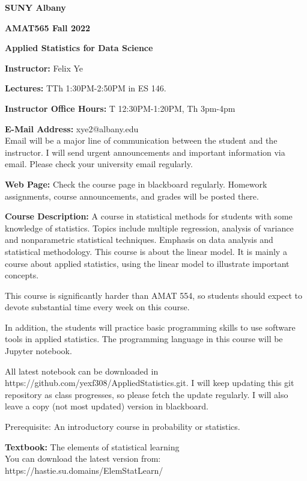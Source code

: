 \documentclass[a4paper,10pt]{article}
\begin{document}
\begin{center}

\textbf{SUNY Albany}

\textbf{AMAT565 Fall 2022}

\textbf{Applied Statistics for Data Science}


\end{center}

\textbf{Instructor:} Felix Ye 

\textbf{Lectures:} TTh 1:30PM-2:50PM  in ES 146.

\textbf{Instructor Office Hours:}  T 12:30PM-1:20PM, Th 3pm-4pm


\textbf{E-Mail Address:} xye2@albany.edu\\
Email will be a major line of communication between the student and the instructor. I will send urgent announcements and important information via email. Please check your university email regularly.

\textbf{Web Page:}
Check the course page in blackboard regularly. Homework assignments, course announcements, and grades will be posted there.


\textbf{Course Description:} 	
A course in statistical methods for students with some knowledge of statistics. Topics include multiple regression, analysis of variance and nonparametric statistical techniques. Emphasis on data analysis and statistical methodology.  
This course is about the linear model. It is mainly a course about applied statistics, using the linear model to illustrate important concepts.

This course is significantly harder than AMAT 554, so students should expect to devote substantial time every week on this course. 

In addition, the students will practice basic programming skills to use software tools in applied statistics. The programming language in this course will be Jupyter notebook. 

All latest notebook can be downloaded in https://github.com/yexf308/AppliedStatistics.git. I will keep updating this git repository as class progresses, so please fetch the update regularly. I will also leave a copy (not most updated) version in blackboard. 

 Prerequisite: An introductory course in probability or statistics.  
 

\textbf{Textbook:} 
The elements of statistical learning \\
You can download the latest version from: https://hastie.su.domains/ElemStatLearn/
\end{document}
